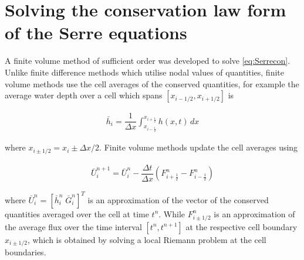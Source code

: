 \documentclass[SingleSpace,12pt,Proceedings]{Serre_ASCE}
\begin{document}
\section{Solving the conservation law form of the Serre equations}
A finite volume method of sufficient order was developed to solve \eqref{eq:Serrecon}. Unlike finite difference methods which utilise nodal values of quantities, finite volume methods use the cell averages of the conserved quantities, for example the average water depth over a cell which spans $\left[x_{i - 1/2} , x_{i + 1/2}\right]$ is 
\begin{linenomath*}
\begin{gather*}
\bar{h}_i = \dfrac{1}{\Delta x} \int_{x_{i-\frac{1}{2}}}^{x_{i+\frac{1}{2}}} h(x,t) \, dx 
\end{gather*}
\end{linenomath*}
where $x_{i \pm 1/2} = x_i \pm \Delta x/2$. Finite volume methods update the cell averages using
\begin{linenomath*}
\begin{gather}\label{eq:FVMupdate}
\bar{U}^{n+1}_i = \bar{U}^{n}_i - \dfrac{\Delta t}{\Delta x} \left(F^n_{i+ \frac{1}{2}} - F^n_{i - \frac{1}{2}} \right)
\end{gather}
\end{linenomath*}
where $\bar{U}^{n}_i = \left[ \bar{h}^{n}_i \; \bar{G}^{n}_i \right] ^T$ is an approximation of the vector of the conserved quantities averaged over the cell at time $t^n$. While $F^n_{i\pm 1/2}$ is an approximation of the average flux over the time interval $[t^n, t^{n+1}]$ at the respective cell boundary $x_{i \pm 1/2 }$, which is obtained by solving a local Riemann problem at the cell boundaries.
\end{document}
